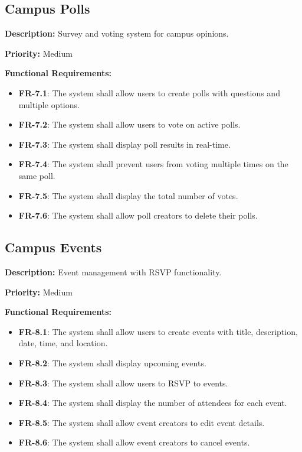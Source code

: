 \documentclass[12pt,a4paper]{article}
\begin{document}
\subsection{Campus Polls}
\textbf{Description:} Survey and voting system for campus opinions.

\textbf{Priority:} Medium

\textbf{Functional Requirements:}

\begin{itemize}
    \item \textbf{FR-7.1}: The system shall allow users to create polls with questions and multiple options.
    \item \textbf{FR-7.2}: The system shall allow users to vote on active polls.
    \item \textbf{FR-7.3}: The system shall display poll results in real-time.
    \item \textbf{FR-7.4}: The system shall prevent users from voting multiple times on the same poll.
    \item \textbf{FR-7.5}: The system shall display the total number of votes.
    \item \textbf{FR-7.6}: The system shall allow poll creators to delete their polls.
\end{itemize}

\subsection{Campus Events}
\textbf{Description:} Event management with RSVP functionality.

\textbf{Priority:} Medium

\textbf{Functional Requirements:}

\begin{itemize}
    \item \textbf{FR-8.1}: The system shall allow users to create events with title, description, date, time, and location.
    \item \textbf{FR-8.2}: The system shall display upcoming events.
    \item \textbf{FR-8.3}: The system shall allow users to RSVP to events.
    \item \textbf{FR-8.4}: The system shall display the number of attendees for each event.
    \item \textbf{FR-8.5}: The system shall allow event creators to edit event details.
    \item \textbf{FR-8.6}: The system shall allow event creators to cancel events.
\end{itemize}
\end{document}
